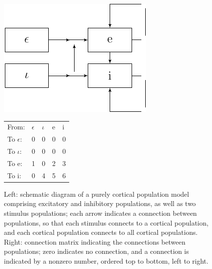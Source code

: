 \documentclass[12pt,a4paper]{article}
\begin{document}
\begin{figure}[h!]\begin{center}
\includegraphics{cortical-model.pdf}
\hspace{3cm}\begin{tabular}{ l l l l l }
	From:& $\epsilon$ & $\iota$ & e & i \\
	To $\epsilon$:& 0 & 0 & 0 & 0 \\
	To $\iota$:& 0 & 0 & 0 & 0 \\
	To e:& 1 & 0 & 2 & 3 \\
	To i:& 0 & 4 & 5 & 6
\end{tabular}
\caption{Left: schematic diagram of a purely cortical population model comprising excitatory and inhibitory populations, as well as two stimulus populations; each arrow indicates a connection between populations, so that each stimulus connects to a cortical population, and each cortical population connects to all cortical populations. Right: connection matrix indicating the connections between populations; zero indicates no connection, and a connection is indicated by a nonzero number, ordered top to bottom, left to right.}
\label{fig:pop}\end{center}\end{figure}
\end{document}

